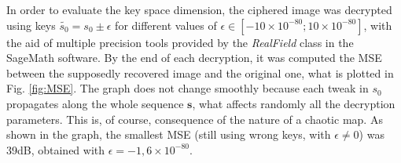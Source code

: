 In order to evaluate the key space dimension, the ciphered image was decrypted using keys $ \widetilde{s_0} = s_0 \pm \epsilon $ for different values of $ \epsilon \in [-10 \times 10^{-80}; 10 \times 10^{-80}]$, with the aid of multiple precision tools provided by the \textit{RealField} class in the SageMath software. By the end of each decryption, it was computed the MSE between the supposedly recovered image and the original one, what is plotted in Fig. \ref{fig:MSE}. The graph does not change smoothly because each tweak in $ s_0 $ propagates along the whole sequence $ \mathbf{s} $, what affects randomly all the decryption parameters. This is, of course, consequence of the nature of a chaotic map. As shown in the graph, the smallest MSE (still using wrong keys, with $ \epsilon \neq 0 $) was 39dB, obtained with $ \epsilon = -1{,}6 \times 10^{-80} $.

